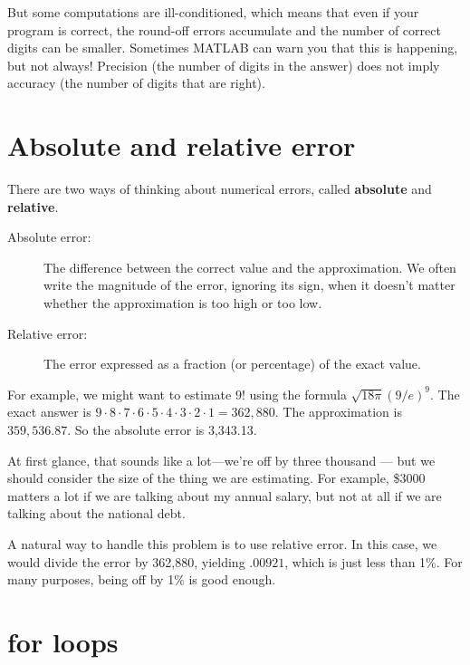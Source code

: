 \documentclass[
]{book}
\numberwithin{Answer}{chapter}
\numberwithin{Exercise}{chapter}
\begin{document}
But some computations are ill-conditioned, which means that even if your program is correct, the round-off errors accumulate and the number of correct digits can be smaller.  Sometimes MATLAB can warn you that
this is happening, but not always!  Precision (the number of digits
in the answer) does not imply accuracy (the number of digits that
are right).


\section{Absolute and relative error}

There are two ways of thinking about numerical errors, called {\bf
absolute} and {\bf relative}.


\begin{description}

\item[Absolute error:] The difference between the correct value and
the approximation.  We often write the magnitude of the error,
ignoring its sign, when it doesn't matter whether the approximation
is too high or too low.

\item[Relative error:] The error expressed as a fraction (or percentage)
of the exact value.
\end{description}

For example, we might want to estimate $9!$ using the formula $\sqrt
{18 \pi} ( 9 / e)^9$.  The exact answer is $9 \cdot 8 \cdot 7 \cdot 6
\cdot 5 \cdot 4 \cdot 3 \cdot 2 \cdot 1 = 362,880$.  The approximation
is $359,536.87$.  So the absolute error is 3,343.13.

At first glance, that sounds like a lot---we're off by three
thousand --- but we should consider the size of the
thing we are estimating.  For example, \$3000 matters a lot
if we are talking about my annual salary, but not at all if we
are talking about the national debt.

A natural way to handle this problem is to use relative
error.
In this case, we would divide the error
by 362,880, yielding $.00921$, which is just less than 1\%.
For many purposes, being off by 1\% is good enough.


\section{for loops}
\end{document}
